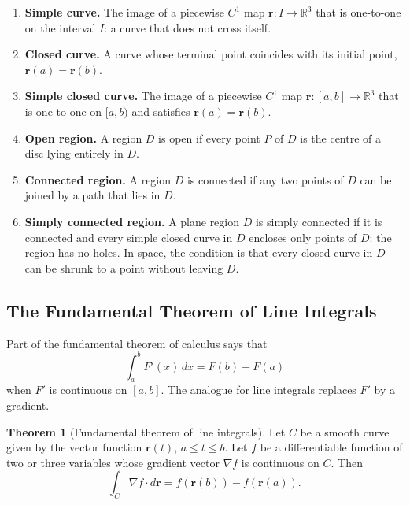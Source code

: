 \documentclass[11pt,a4paper]{article}
\theoremstyle{definition}
\newtheorem{thm}{Theorem}[subsection]
\begin{document}
\begin{enumerate}
\item[] \textbf{Simple curve.} The image of a piecewise $C^1$ map
$\mathbf r: I \to \mathbb{R}^3$ that is one-to-one on the interval $I$: a curve
that does not cross itself.

\item[] \textbf{Closed curve.} A curve whose terminal point coincides with its
initial point, $\mathbf r(a) = \mathbf r(b)$.

\item[] \textbf{Simple closed curve.} The image of a piecewise $C^1$ map
$\mathbf r: [a,b] \to \mathbb{R}^3$ that is one-to-one on $[a,b)$ and satisfies
$\mathbf r(a) = \mathbf r(b)$.

\item[] \textbf{Open region.} A region $D$ is open if every point $P$ of $D$ is
the centre of a disc lying entirely in $D$.

\item[] \textbf{Connected region.} A region $D$ is connected if any two points of
$D$ can be joined by a path that lies in $D$.

\item[] \textbf{Simply connected region.} A plane region $D$ is simply connected
if it is connected and every simple closed curve in $D$ encloses only points of
$D$: the region has no holes. In space, the condition is that every closed curve
in $D$ can be shrunk to a point without leaving $D$.
\end{enumerate}

{\color[wave]{485}\subsection{The Fundamental Theorem of Line Integrals}}

Part of the fundamental theorem of calculus says that
\[\int^b_a F'(x)\,dx = F(b) - F(a)\]
when $F'$ is continuous on $[a,b]$. The analogue for line integrals replaces
$F'$ by a gradient.

\begin{thm}[Fundamental theorem of line integrals]
\label{thm:ftli}
Let $C$ be a smooth curve given by the vector function $\mathbf r(t)$,
$a\leq t \leq b$. Let $f$ be a differentiable function of two or three variables
whose gradient vector $\nabla f$ is continuous on $C$. Then
\[\int_C \nabla f \cdot d\mathbf r = f(\mathbf r(b)) - f(\mathbf r(a)) .\]
\end{thm}
\end{document}
